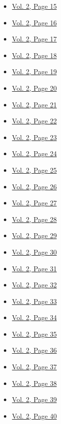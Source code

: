 \begin{itemize}
\begin{itemize}
  \item
    \protect\hyperlink{g-page-227}{Vol. 2, Page 15}
  \item
    \protect\hyperlink{g-page-228}{Vol. 2, Page 16}
  \item
    \protect\hyperlink{g-page-229}{Vol. 2, Page 17}
  \item
    \protect\hyperlink{g-page-230}{Vol. 2, Page 18}
  \item
    \protect\hyperlink{g-page-231}{Vol. 2, Page 19}
  \item
    \protect\hyperlink{g-page-232}{Vol. 2, Page 20}
  \item
    \protect\hyperlink{g-page-233}{Vol. 2, Page 21}
  \item
    \protect\hyperlink{g-page-234}{Vol. 2, Page 22}
  \item
    \protect\hyperlink{g-page-235}{Vol. 2, Page 23}
  \item
    \protect\hyperlink{g-page-236}{Vol. 2, Page 24}
  \item
    \protect\hyperlink{g-page-237}{Vol. 2, Page 25}
  \item
    \protect\hyperlink{g-page-238}{Vol. 2, Page 26}
  \item
    \protect\hyperlink{g-page-239}{Vol. 2, Page 27}
  \item
    \protect\hyperlink{g-page-240}{Vol. 2, Page 28}
  \item
    \protect\hyperlink{g-page-241}{Vol. 2, Page 29}
  \item
    \protect\hyperlink{g-page-242}{Vol. 2, Page 30}
  \item
    \protect\hyperlink{g-page-243}{Vol. 2, Page 31}
  \item
    \protect\hyperlink{g-page-244}{Vol. 2, Page 32}
  \item
    \protect\hyperlink{g-page-245}{Vol. 2, Page 33}
  \item
    \protect\hyperlink{g-page-246}{Vol. 2, Page 34}
  \item
    \protect\hyperlink{g-page-247}{Vol. 2, Page 35}
  \item
    \protect\hyperlink{g-page-248}{Vol. 2, Page 36}
  \item
    \protect\hyperlink{g-page-249}{Vol. 2, Page 37}
  \item
    \protect\hyperlink{g-page-250}{Vol. 2, Page 38}
  \item
    \protect\hyperlink{g-page-251}{Vol. 2, Page 39}
  \item
    \protect\hyperlink{g-page-252}{Vol. 2, Page 40}

\end{itemize}
\end{itemize}
